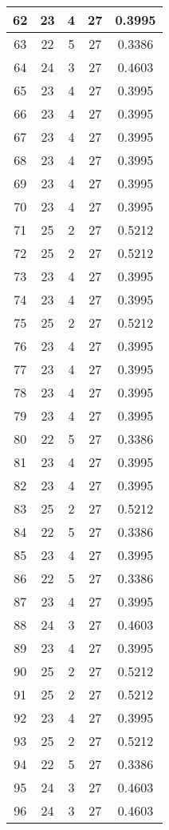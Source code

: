 \documentclass[letterpaper, 12pt]{article}
\begin{document}
\begin{longtable}{|c|c|c|c|c|}
\hline
62 & 23 & 4 & 27 & 0.3995 \\
\hline
63 & 22 & 5 & 27 & 0.3386 \\
\hline
64 & 24 & 3 & 27 & 0.4603 \\
\hline
65 & 23 & 4 & 27 & 0.3995 \\
\hline
66 & 23 & 4 & 27 & 0.3995 \\
\hline
67 & 23 & 4 & 27 & 0.3995 \\
\hline
68 & 23 & 4 & 27 & 0.3995 \\
\hline
69 & 23 & 4 & 27 & 0.3995 \\
\hline
70 & 23 & 4 & 27 & 0.3995 \\
\hline
71 & 25 & 2 & 27 & 0.5212 \\
\hline
72 & 25 & 2 & 27 & 0.5212 \\
\hline
73 & 23 & 4 & 27 & 0.3995 \\
\hline
74 & 23 & 4 & 27 & 0.3995 \\
\hline
75 & 25 & 2 & 27 & 0.5212 \\
\hline
76 & 23 & 4 & 27 & 0.3995 \\
\hline
77 & 23 & 4 & 27 & 0.3995 \\
\hline
78 & 23 & 4 & 27 & 0.3995 \\
\hline
79 & 23 & 4 & 27 & 0.3995 \\
\hline
80 & 22 & 5 & 27 & 0.3386 \\
\hline
81 & 23 & 4 & 27 & 0.3995 \\
\hline
82 & 23 & 4 & 27 & 0.3995 \\
\hline
83 & 25 & 2 & 27 & 0.5212 \\
\hline
84 & 22 & 5 & 27 & 0.3386 \\
\hline
85 & 23 & 4 & 27 & 0.3995 \\
\hline
86 & 22 & 5 & 27 & 0.3386 \\
\hline
87 & 23 & 4 & 27 & 0.3995 \\
\hline
88 & 24 & 3 & 27 & 0.4603 \\
\hline
89 & 23 & 4 & 27 & 0.3995 \\
\hline
90 & 25 & 2 & 27 & 0.5212 \\
\hline
91 & 25 & 2 & 27 & 0.5212 \\
\hline
92 & 23 & 4 & 27 & 0.3995 \\
\hline
93 & 25 & 2 & 27 & 0.5212 \\
\hline
94 & 22 & 5 & 27 & 0.3386 \\
\hline
95 & 24 & 3 & 27 & 0.4603 \\
\hline
96 & 24 & 3 & 27 & 0.4603 \\

\end{longtable}
\end{document}
